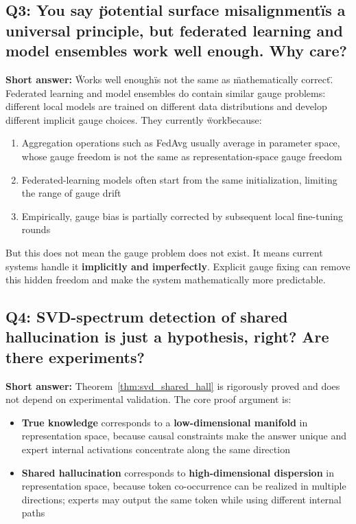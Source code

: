 \documentclass[12pt,a4paper]{article}
\theoremstyle{remark}
\begin{document}
\subsection*{Q3: You say \"potential surface misalignment\" is a universal principle, but federated learning and model ensembles work well enough. Why care?}

\textbf{Short answer:} \"Works well enough\" is not the same as \"mathematically correct\". Federated learning and model ensembles do contain similar gauge problems: different local models are trained on different data distributions and develop different implicit gauge choices. They currently \"work\" because:

\begin{enumerate}
    \item Aggregation operations such as FedAvg usually average in parameter space, whose gauge freedom is not the same as representation-space gauge freedom
    \item Federated-learning models often start from the same initialization, limiting the range of gauge drift
    \item Empirically, gauge bias is partially corrected by subsequent local fine-tuning rounds
\end{enumerate}

But this does not mean the gauge problem does not exist. It means current systems handle it \textbf{implicitly and imperfectly}. Explicit gauge fixing can remove this hidden freedom and make the system mathematically more predictable.

\subsection*{Q4: SVD-spectrum detection of shared hallucination is just a hypothesis, right? Are there experiments?}

\textbf{Short answer:} Theorem~\ref{thm:svd_shared_hall} is rigorously proved and does not depend on experimental validation. The core proof argument is:

\begin{itemize}
    \item \textbf{True knowledge} corresponds to a \textbf{low-dimensional manifold} in representation space, because causal constraints make the answer unique and expert internal activations concentrate along the same direction
    \item \textbf{Shared hallucination} corresponds to \textbf{high-dimensional dispersion} in representation space, because token co-occurrence can be realized in multiple directions; experts may output the same token while using different internal paths
\end{itemize}
\end{document}
